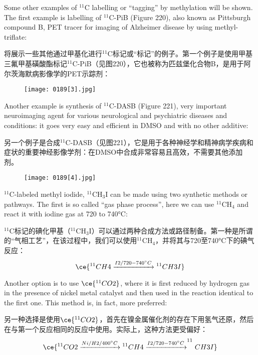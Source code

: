\documentclass[dvipsnames, svgnames,a4paper,11pt]{article}
\begin{document}
Some other examples of ${}^\mathrm{11}\mathrm{C}$ labelling or “tagging” by methylation will be shown. The first example is labelling of $\mathrm{{}^{11}C}$-PiB (Figure 220), also known as Pittsburgh compound B, PET tracer for imaging of Alzheimer disease by using methyl-triflate:

将展示一些其他通过甲基化进行${}^\mathrm{11}\mathrm{C}$标记或“标记”的例子。第一个例子是使用甲基三氟甲基磺酸酯标记$\mathrm{{}^{11}C}$-PiB（见图220），它也被称为匹兹堡化合物B，是用于阿尔茨海默病影像学的PET示踪剂：

\begin{figure}[h]
	\centering
    \texttt{[image: 0189[3].jpg]}  
     \label{fig220}
\end{figure}

Another example is synthesis of $\mathrm{{}^{11}C}$-DASB (Figure 221), very important neuroimaging agent for various neurological and psychiatric diseases and conditions: it goes very easy and efficient in DMSO and with no other additive:

另一个例子是合成$\mathrm{{}^{11}C}$-DASB（见图221），它是用于各种神经学和精神病学疾病和症状的重要神经影像学剂：在DMSO中合成非常容易且高效，不需要其他添加剂。

\begin{figure}[h]
	\centering
    \texttt{[image: 0189[4].jpg]}  
     \label{fig221}
\end{figure}

$\mathrm{{}^{11}C}$-labeled methyl iodide, $\mathrm{{}^{11}CH_3I}$ can be made using two synthetic methods or pathways. The first is so called “gas phase process”, here we can use $\mathrm{{}^{11}CH_4}$ and react it with iodine gas at 720 to 740°C:

$\mathrm{{}^{11}C}$标记的碘化甲基（$\mathrm{{}^{11}CH_3I}$）可以通过两种合成方法或路径制备。第一种是所谓的“气相工艺”，在该过程中，我们可以使用$\mathrm{{}^{11}CH_4}$，并将其与720至740°C下的碘气反应：
\[
\ce{^{11}CH4 \xrightarrow{I2/720-740^\circ C} {}^{11}CH3I}
\]

Another option is to use \(\ce{^{11}CO2}\), where it is first reduced by hydrogen gas in the
presence of nickel metal catalyst and then used in the reaction identical to the first one.
This method is, in fact, more preferred:

另一种选择是使用\(\ce{^{11}CO2}\)，首先在镍金属催化剂的存在下用氢气还原，然后在与第一个反应相同的反应中使用。实际上，这种方法更受偏好：
\[
\ce{^{11}CO2 \xrightarrow{Ni/H2/400^\circ C} {}^{11}CH4 \xrightarrow{I2/720-740^\circ C} ^{11}CH3I}
\]
\end{document}
